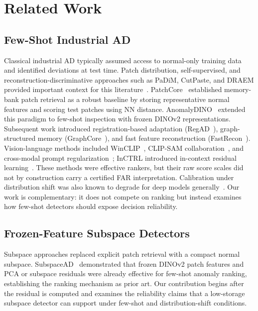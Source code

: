 \section{Related Work}\label{sec:related}
\subsection{Few-Shot Industrial AD}
Classical industrial AD typically assumed access to normal-only training data and identified deviations at test time. Patch distribution, self-supervised, and reconstruction-discriminative approaches such as PaDiM, CutPaste, and DRAEM provided important context for this literature~\cite{padim2021,cutpaste2021,draem2021}. PatchCore~\cite{roth2022towards} established memory-bank patch retrieval as a robust baseline by storing representative normal features and scoring test patches using NN distance. AnomalyDINO~\cite{damm2025anomalydino} extended this paradigm to few-shot inspection with frozen DINOv2 representations. Subsequent work introduced registration-based adaptation (RegAD~\cite{regad2022}), graph-structured memory (GraphCore~\cite{graphcore2023}), and fast feature reconstruction (FastRecon~\cite{fastrecon2023}). Vision-language methods included WinCLIP~\cite{winclip2023}, CLIP-SAM collaboration~\cite{clipsam2025}, and cross-modal prompt regularization~\cite{uniadprompt2026}; InCTRL introduced in-context residual learning~\cite{inctrl2024}. These methods were effective rankers, but their raw score scales did not by construction carry a certified FAR interpretation. Calibration under distribution shift was also known to degrade for deep models generally~\cite{ovadia2019trust}. Our work is complementary: it does not compete on ranking but instead examines how few-shot detectors should expose decision reliability.

\subsection{Frozen-Feature Subspace Detectors}
Subspace approaches replaced explicit patch retrieval with a compact normal subspace. SubspaceAD~\cite{subspacead2026} demonstrated that frozen DINOv2 patch features and PCA or subspace residuals were already effective for few-shot anomaly ranking, establishing the ranking mechanism as prior art. Our contribution begins after the residual is computed and examines the reliability claims that a low-storage subspace detector can support under few-shot and distribution-shift conditions.

